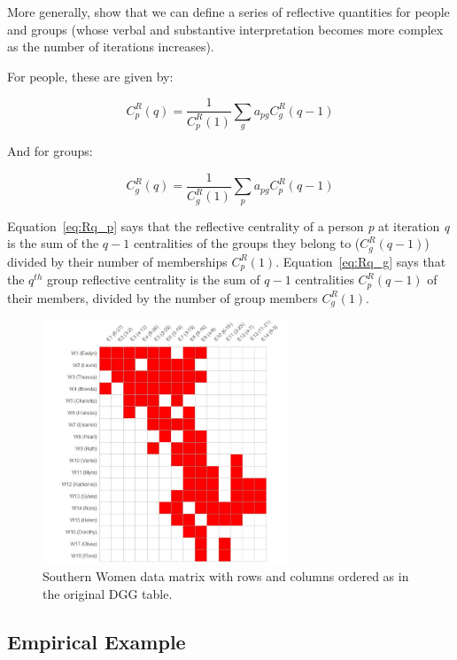\documentclass[a4paper,fleqn]{cas-sc}
\begin{document}
More generally, \citet{hidalgo2009building} show that we can define a series of reflective quantities for people and groups (whose verbal and substantive interpretation becomes more complex as the number of iterations increases). 

For people, these are given by:

\begin{equation}   
    C^R_p(q) = \frac{1}{C^R_p(1)}\sum_g a_{pg}C^R_g(q-1) 
   \label{eq:Rq_p}
\end{equation}

And for groups:

\begin{equation}
   C^R_g(q) = \frac{1}{C^R_g(1)}\sum_p a_{pg}C^R_p(q-1)
   \label{eq:Rq_g}
\end{equation}

Equation~\ref{eq:Rq_p} says that the reflective centrality of a person \textit{p} at iteration \textit{q} is the sum of the $q-1$ centralities of the groups they belong to ($C^R_g(q-1)$) divided by their number of memberships $C^{R}_p(1)$. Equation~\ref{eq:Rq_g} says that the $q^{th}$ group reflective centrality is the sum of $q-1$ centralities $C^R_p(q-1)$ of their members, divided by the number of group members $C^R_g(1)$.

\begin{figure}[ht!]
    \captionsetup[subfigure]{font=footnotesize,labelfont=footnotesize}
    \centering
    \includegraphics[width=0.65\textwidth]{Plots/southern-women.jpg}
    \caption{Southern Women data matrix with rows and columns ordered as in the original DGG table.}
    \label{fig:sw}
\end{figure}

\subsection{Empirical Example} \label{subsec:ex}
\end{document}
